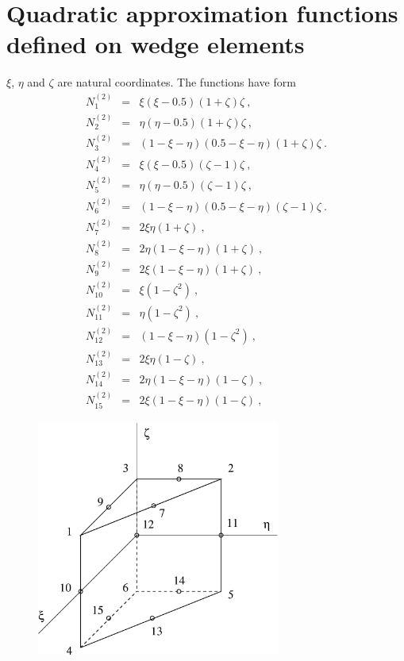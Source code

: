 \section{Quadratic approximation functions defined on wedge elements}
$\xi$, $\eta$ and $\zeta$ are natural coordinates. The functions have form
\begin{eqnarray}
\label{bfquadwedn1}
N_1^{(2)} &=& \xi(\xi-0.5)(1 + \zeta)\zeta\ ,
\\
\label{bfquadwedn2}
N_2^{(2)} &=& \eta(\eta-0.5)(1 + \zeta)\zeta\ ,
\\
\label{bfquadwedn3}
N_3^{(2)} &=& (1 - \xi - \eta)(0.5-\xi-\eta)(1 + \zeta)\zeta\ .
\\
\label{bfquadwedn4}
N_4^{(2)} &=& \xi(\xi-0.5)(\zeta - 1)\zeta\ ,
\\
\label{bfquadwedn5}
N_5^{(2)} &=& \eta(\eta-0.5)(\zeta - 1)\zeta\ ,
\\
\label{bfquadwedn6}
N_6^{(2)} &=& (1 - \xi - \eta)(0.5-\xi-\eta)(\zeta - 1)\zeta\ .
\\
\label{bfquadwedn7}
N_7^{(2)} &=& 2 \xi \eta (1 + \zeta)\ ,
\\
\label{bfquadwedn8}
N_8^{(2)} &=& 2 \eta (1 - \xi - \eta)(1 + \zeta)\ ,
\\
\label{bfquadwedn9}
N_9^{(2)} &=& 2 \xi (1 - \xi - \eta)(1 + \zeta)\ ,
\\
\label{bfquadwedn10}
N_{10}^{(2)} &=& \xi (1 - \zeta^2)\ ,
\\
\label{bfquadwedn11}
N_{11}^{(2)} &=& \eta (1 - \zeta^2)\ ,
\\
\label{bfquadwedn12}
N_{12}^{(2)} &=& (1 - \xi - \eta)(1 - \zeta^2)\ ,
\\
\label{bfquadwedn13}
N_{13}^{(2)} &=& 2 \xi \eta (1 - \zeta)\ ,
\\
\label{bfquadwedn14}
N_{14}^{(2)} &=& 2 \eta (1 - \xi - \eta)(1 - \zeta)\ ,
\\
\label{bfquadwedn15}
N_{15}^{(2)} &=& 2 \xi (1 - \xi - \eta)(1 - \zeta)\ ,
\end{eqnarray}


\begin{figure}
\begin{center}
\includegraphics[width=80mm]{FIG/quadwedge.eps}
\end{center}
\end{figure}

